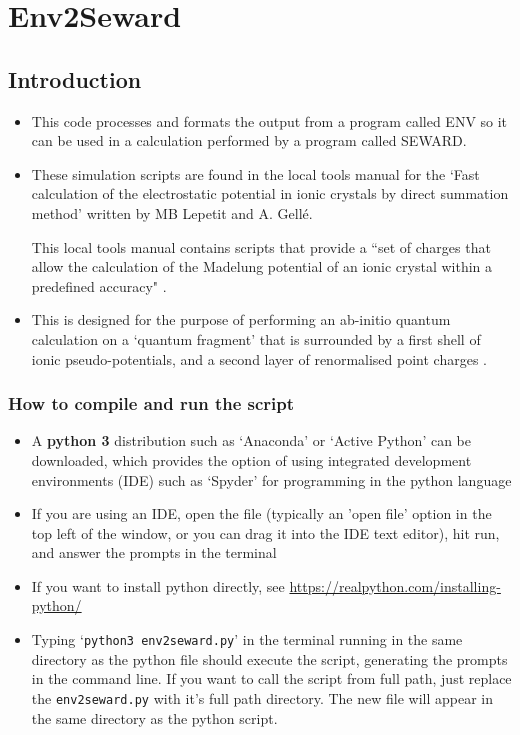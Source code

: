\section{Env2Seward}
\subsection{Introduction}
\begin{itemize}
	\item This code processes and formats the output from a program called ENV so it can be used in a calculation performed by a program called SEWARD.
	\item These simulation scripts are found in the local tools manual for the `Fast calculation of the electrostatic potential in ionic crystals by direct summation method' written by MB Lepetit and A. Gell\'e.
	
	This local tools manual contains scripts that provide a ``set of charges that allow the calculation of the Madelung potential of an ionic crystal within a predefined accuracy" \cite{gelle2008fast}.
	\item This is designed for the purpose of performing an ab-initio quantum calculation on a `quantum fragment' that is surrounded by a first shell of ionic pseudo-potentials, and a second layer of renormalised point charges \cite{varignon2013ab}.
\end{itemize} 

\subsubsection{How to compile and run the script}
\begin{itemize}
	\item A {\bf python 3} distribution such as `Anaconda' or `Active Python' can be downloaded, which provides the option of using integrated development environments (IDE) such as `Spyder' for programming in the python language
	\item If you are using an IDE, open the file (typically an 'open file' option in the top left of the window, or you can drag it into the IDE text editor), hit run, and answer the prompts in the terminal
	\item If you want to install python directly, see \url{https://realpython.com/installing-python/}
	\item Typing `\texttt{python3 env2seward.py}' in the terminal running in the same directory as the python file should execute the script, generating the prompts in the command line. If you want to call the script from full path, just replace the \texttt{env2seward.py} with it's full path directory. The new file will appear in the same directory as the python script.
\end{itemize} 
